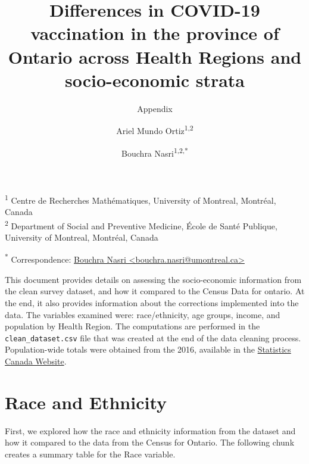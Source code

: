 \documentclass[
  letterpaper,
  DIV=11,
  numbers=noendperiod]{scrartcl}
\title{\textbf{Differences in COVID-19 vaccination in the province of
Ontario across Health Regions and socio-economic strata}}
\subtitle{Appendix}
\author{Ariel Mundo Ortiz\textsuperscript{1,2} \and Bouchra
Nasri\textsuperscript{1,2,*}}
\date{}
\begin{document}
\maketitle
\setcounter{page}{1}
\renewcommand\thesection{A}
\renewcommand\thesubsection{\thesection.\arabic{subsection}}
\renewcommand{\thepage}{A-\arabic{page}}
\renewcommand{\thetable}{A-\arabic{table}}
\renewcommand\thefigure{\thesection-\arabic{figure}}


\ifdefined\Shaded\renewenvironment{Shaded}{\begin{tcolorbox}[boxrule=0pt, borderline west={3pt}{0pt}{shadecolor}, interior hidden, enhanced, breakable, frame hidden, sharp corners]}{\end{tcolorbox}}\fi

\textsuperscript{1} Centre de Recherches Mathématiques, University of
Montreal, Montréal, Canada\\
\textsuperscript{2} Department of Social and Preventive Medicine, École
de Santé Publique, University of Montreal, Montréal, Canada

\textsuperscript{*} Correspondence:
\href{mailto:bouchra.nasri@umontreal.ca}{Bouchra Nasri
\textless{}bouchra.nasri@umontreal.ca\textgreater{}}

This document provides details on assessing the socio-economic
information from the clean survey dataset, and how it compared to the
Census Data for ontario. At the end, it also provides information about
the corrections implemented into the data. The variables examined were:
race/ethnicity, age groups, income, and population by Health Region. The
computations are performed in the \texttt{clean\_dataset.csv} file that
was created at the end of the data cleaning process. Population-wide
totals were obtained from the 2016, available in the
\href{https://www12.statcan.gc.ca/census-recensement/2016/dp-pd/prof/details/Page.cfm?Lang=E\&Geo1=PR\&Code1=35\&Geo2=\&Code2=\&Data=Count\&SearchText=Ontario\&Sear}{Statistics
Canada Website}.

\hypertarget{race-and-ethnicity}{%
\section{Race and Ethnicity}\label{race-and-ethnicity}}

First, we explored how the race and ethnicity information from the
dataset and how it compared to the data from the Census for Ontario. The
following chunk creates a summary table for the Race variable.
\end{document}
